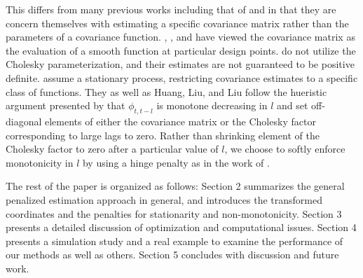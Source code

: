 This differs from many previous works including that of \citet{bickel2008regularized} and \citet{huang2006covariance} in that they are concern themselves with estimating a specific covariance matrix rather than the parameters of a covariance function. \citet{huang2007estimation}, \citet{kaufman2008covariance}, and \citet{yao2005functional} have viewed the covariance matrix as the evaluation of a smooth function at particular design points. \citet{yao2005functional} do not utilize the Cholesky parameterization, and their estimates are not guaranteed to be positive definite. \citet{kaufman2008covariance} assume a stationary process, restricting covariance estimates to a specific class of functions. They as well as  Huang, Liu, and Liu \cite{huang2007estimation} follow the hueristic argument presented by \cite{pourahmadi1999joint} that $\phi_{t,t-l}$ is monotone decreasing in $l$ and set off-diagonal elements of either the covariance matrix or the Cholesky factor corresponding to large lags to zero. Rather than shrinking element of the Cholesky factor to zero after a particular value of $l$, we choose to softly enforce monotonicity in $l$ by using a hinge penalty as in the work of \citet{tibshirani2011nearly}.
	
The rest of the paper is organized as follows: Section 2 summarizes the general penalized estimation approach in general, and introduces  the transformed coordinates and the penalties for stationarity and non-monotonicity. Section 3 presents a detailed discussion of optimization and computational issues. Section 4 presents a simulation study and a real example to examine the performance of our methods as well as others. Section 5 concludes with discussion and future work.	

